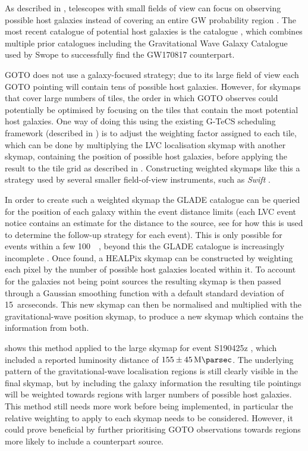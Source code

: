 \begin{colsection}

As described in , telescopes with small fields of view can focus on observing possible host galaxies instead of covering an entire GW probability region \citep{GW_weighting}. The most recent catalogue of potential host galaxies is the  catalogue \citep{GLADE}, which combines multiple prior catalogues including the Gravitational Wave Galaxy Catalogue \citep[GWGC,][]{GWGC} used by Swope to successfully find the GW170817 counterpart.

GOTO does not use a galaxy-focused strategy; due to its large field of view each GOTO pointing will contain tens of possible host galaxies. However, for skymaps that cover large numbers of tiles, the order in which GOTO observes could potentially be optimised by focusing on the tiles that contain the most potential host galaxies. One way of doing this using the existing G-TeCS scheduling framework (described in ) is to adjust the weighting factor assigned to each tile, which can be done by multiplying the LVC localisation skymap with another skymap, containing the position of possible host galaxies, before applying the result to the tile grid as described in . Constructing weighted skymaps like this a strategy used by several smaller field-of-view instruments, such as \textit{Swift} \citep{GW_Swift}.

In order to create such a weighted skymap the GLADE catalogue can be queried for the position of each galaxy within the event distance limits (each LVC event notice contains an estimate for the distance to the source, see  for how this is used to determine the follow-up strategy for each event). This is only possible for events within a few \SI{100}{\mega\parsec}, beyond this the GLADE catalogue is increasingly incomplete \citep{GLADE}. Once found, a HEALPix skymap can be constructed by weighting each pixel by the number of possible host galaxies located within it. To account for the galaxies not being point sources the resulting skymap is then passed through a Gaussian smoothing function with a default standard deviation of 15~arcseconds. This new skymap can then be normalised and multiplied with the gravitational-wave position skymap, to produce a new skymap which contains the information from both.

 shows this method applied to the large skymap for event S190425z \citep{S190425z}, which included a reported luminosity distance of $155\pm\SI{45}{\mega\parsec}$. The underlying pattern of the gravitational-wave localisation regions is still clearly visible in the final skymap, but by including the galaxy information the resulting tile pointings will be weighted towards regions with larger numbers of possible host galaxies. This method still needs more work before being implemented, in particular the relative weighting to apply to each skymap needs to be considered. However, it could prove beneficial by further prioritising GOTO observations towards regions more likely to include a counterpart source.


\end{colsection}
